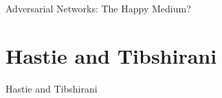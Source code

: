 \documentclass{beamer}
\begin{document}
\begin{frame}{Adversarial Networks: The Happy Medium?}

\end{frame}

\section{Hastie and Tibshirani}

\begin{frame}{Hastie and Tibshirani}

\end{frame}
\end{document}
